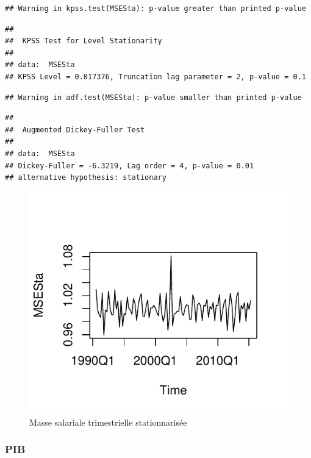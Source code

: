 \documentclass[11pt,]{article}
\begin{document}
\begin{verbatim}
## Warning in kpss.test(MSESta): p-value greater than printed p-value
\end{verbatim}

\begin{verbatim}
## 
##  KPSS Test for Level Stationarity
## 
## data:  MSESta
## KPSS Level = 0.017376, Truncation lag parameter = 2, p-value = 0.1
\end{verbatim}

\begin{verbatim}
## Warning in adf.test(MSESta): p-value smaller than printed p-value
\end{verbatim}

\begin{verbatim}
## 
##  Augmented Dickey-Fuller Test
## 
## data:  MSESta
## Dickey-Fuller = -6.3219, Lag order = 4, p-value = 0.01
## alternative hypothesis: stationary
\end{verbatim}

\begin{figure}[htbp]
\centering
\includegraphics{Rapport_final_files/figure-latex/unnamed-chunk-14-1.pdf}
\caption{\label{fig12} Masse salariale trimestrielle stationnarisée}
\end{figure}

\newpage

\subsubsection{PIB}\label{pib-1}
\end{document}
